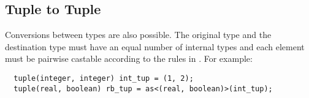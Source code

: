 \documentclass[../gazprea.tex]{subfiles}
\begin{document}
\subsection{Tuple to Tuple}
\label{ssec:typeCasting_ttot}
Conversions between  types are also possible. The original type and the destination type
must have an equal number of internal types and each element must be pairwise castable according to
the rules in . For example:
\begin{lstlisting}
  tuple(integer, integer) int_tup = (1, 2);
  tuple(real, boolean) rb_tup = as<(real, boolean)>(int_tup);
\end{lstlisting}
\end{document}
